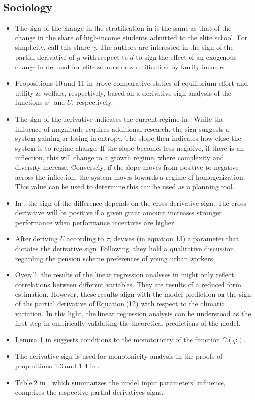 \documentclass[11pt]{book}
\begin{document}
\subsection{Sociology}
\begin{itemize}
\item The sign of the change in the stratification in \cite{estrada2017effect}
is the same as that of the change in the share of high-income students
admitted to the elite school. For simplicity, call this share $\gamma$.
The authors are interested in the sign of the partial derivative of
$g$ with respect to $d$ to sign the effect of an exogenous change
in demand for elite schools on stratification by family income.
\item Propositions 10 and 11 in \cite{ushchev2017technology}
prove comparative statics of equilibrium effort and utility \& welfare,
respectively, based on a derivative sign analysis of the functions
$x^{*}$ and $U$, respectively.
\item The sign of the derivative indicates the current regime in \cite{lancaster2018information}.
While the influence of magnitude requires additional research, the
sign suggests a system gaining or losing in entropy. The slope then
indicates how close the system is to regime change. If the slope becomes
less negative, if there is an inflection, this will change to a growth
regime, where complexity and diversity increase. Conversely, if the
slope moves from positive to negative across the inflection, the system
moves towards a regime of homogenization. This value can be used to
determine this can be used as a planning tool.
\item In \cite{montalban2018role},
the sign of the difference depends on the cross-derivative sign. The
cross-derivative will be positive if a given grant amount increases
stronger performance when performance incentives are higher.
\item After deriving $U$ according to $\tau$, \cite{kemmerling2019redistributive}
devises (in equation 13) a parameter that dictates the derivative
sign. Following, they hold a qualitative discussion regarding the
pension scheme preferences of young urban workers.
\item Overall, the results of the linear regression analyses in \cite{deuster2019climate}
might only reflect correlations between different variables. They
are results of a reduced form estimation. However, these results align
with the model prediction on the sign of the partial derivative of
Equation (12) with respect to the climatic variation. In this light,
the linear regression analysis can be understood as the first step
in empirically validating the theoretical predictions of the model.
\item Lemma 1 in \cite{chamberlain2020social}
suggests conditions to the monotonicity of the function $C(\varphi)$.
\item The derivative sign is used for monotonicity analysis in the proofs
of propositions 1.3 and 1.4 in \cite{cortes2020essays}.
\item Table 2 in \cite{hambel2021social},
which summarizes the model input parameters' influence, comprises
the respective partial derivatives signs.
\end{itemize}
\end{document}
